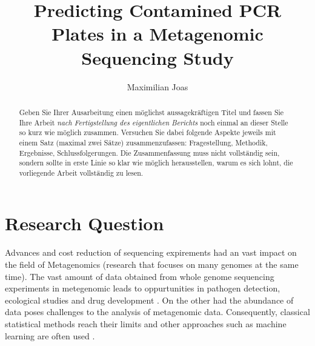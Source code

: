 \documentclass{svproc}
\begin{document}
\mainmatter              %
%
\title{Predicting Contamined PCR Plates in a Metagenomic Sequencing Study}
%
%
\author{Maximilian Joas }
%
%
%
%
\maketitle              %
%
\begin{abstract}
    Geben Sie Ihrer Ausarbeitung einen möglichst aussagekräftigen Titel und fassen Sie Ihre Arbeit \textit{nach Fertigstellung des eigentlichen Berichts} noch einmal an dieser Stelle so kurz wie möglich zusammen. Versuchen Sie dabei folgende Aspekte jeweils mit einem Satz (maximal zwei Sätze) zusammenzufassen: Fragestellung, Methodik, Ergeb\-nisse, Schlussfolgerungen. Die Zusammenfassung muss nicht voll\-ständig sein, sondern sollte in erste Linie so klar wie möglich herausstellen, warum es sich lohnt, die vorliegende Arbeit vollständig zu lesen.
\end{abstract}
%
%
\section{Research Question}
%
Advances and cost reduction of sequencing expirements had an vast impact on the field of Metagenomics (research that focuses on many genomes at the same time). The vast amount of data obtained from whole genome sequencing experiments in metegenomic leads to oppurtunities in pathogen detection, ecological studies and drug development \cite{THREE OPNE TABS}. On the other had the abundance of data poses challenges to the analysis of metagenomic data. Consequently, classical statistical methods reach their limits and other approaches such as machine learning are often used \cite{Paperunde}.\\
\end{document}
